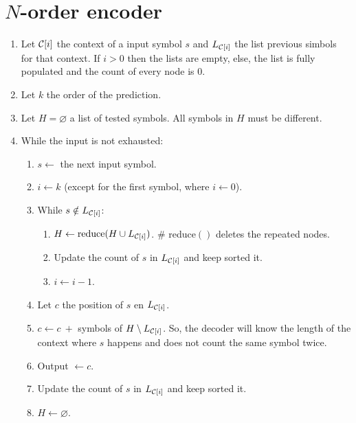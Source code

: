 \section{$N$-order encoder}
\begin{enumerate}
\def\labelenumi{\arabic{enumi}.}
\tightlist
\item
  Let \({\cal C}[i]\) the context of a input symbol \(s\) and
  \(L_{{\cal C}[i]}\) the list previous simbols for that context. If
  \(i>0\) then the lists are empty, else, the list is fully populated
  and the count of every node is \(0\).
\item
  Let \(k\) the order of the prediction.
\item
  Let \(H=\varnothing\) a list of tested symbols. All symbols in \(H\)
  must be different.
\item
  While the input is not exhausted:
  \begin{enumerate}
  \def\labelenumii{\arabic{enumii}.}
  \tightlist
  \item
    \(s\leftarrow\) the next input symbol.
  \item
    \(i\leftarrow k\) (except for the first symbol, where
    \(i\leftarrow 0\)).
  \item
    While \(s\notin L_{{\cal C}[i]}\):
    \begin{enumerate}
    \def\labelenumiii{\arabic{enumiii}.}
    \tightlist
    \item
      \(H\leftarrow \text{reduce}(H\cup L_{{\cal C}[i]})\). \#
      reduce\(()\) deletes the repeated nodes.
    \item
      Update the count of \(s\) in \(L_{{\cal C}[i]}\) and keep sorted
      it.
    \item
      \(i\leftarrow i-1\).
    \end{enumerate}
  \item
    Let \(c\) the position of \(s\) en \(L_{{\cal C}[i]}\).
  \item
    \(c\leftarrow c~+\) symbols of \(H\setminus L_{{\cal C}[i]}\). So,
    the decoder will know the length of the context where \(s\) happens
    and does not count the same symbol twice.
  \item
    Output \(\leftarrow c\).
  \item
    Update the count of \(s\) in \(L_{{\cal C}[i]}\) and keep sorted it.
  \item
    \(H\leftarrow\varnothing\).
  \end{enumerate}
\end{enumerate}

